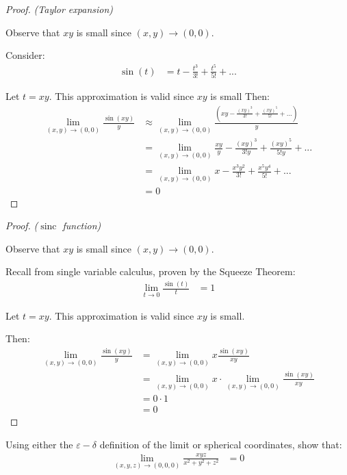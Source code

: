 \begin{proof}
\textit{(Taylor expansion)}

Observe that \(xy\) is small since \((x, y) \rightarrow (0, 0)\). 

Consider:
    \begin{align}
        \sin(t) &= t - \frac{t^3}{3!} + \frac{t^5}{5!} + ...
    \end{align}

\newpage 

Let \(t = xy\). This approximation is valid since \(xy\) is small Then:
    \begin{align*}
        \lim_{(x, y) \rightarrow (0, 0)} \frac{\sin(xy)}{y} &\approx \lim_{(x, y) \rightarrow (0, 0)} \frac{\left(xy - \frac{(xy)^3}{3!} + \frac{(xy)^5}{5!} + ...\right)}{y} \\
        &= \lim_{(x, y) \rightarrow (0, 0)} \frac{xy}{y} - \frac{(xy)^3}{3!y} + \frac{(xy)^5}{5!y} + ... \\
        &= \lim_{(x, y) \rightarrow (0, 0)} x - \frac{x^3y^2}{3!} + \frac{x^5y^4}{5!} + ... \\
        &= 0
    \end{align*}
\end{proof}

\begin{proof}
\textit{(\(\operatorname{sinc}\) function)}

Observe that \(xy\) is small since \((x, y) \rightarrow (0, 0)\). 

Recall from single variable calculus, proven by the Squeeze Theorem:
    \begin{align}
        \lim_{t \rightarrow 0} \frac{\sin(t)}{t} &= 1
    \end{align}

Let \(t = xy\). This approximation is valid since \(xy\) is small.

Then:
    \begin{align*}
        \lim_{(x, y) \rightarrow (0, 0)} \frac{\sin(xy)}{y} &= \lim_{(x, y) \rightarrow (0, 0)} x\frac{\sin(xy)}{xy} \\
        &= \lim_{(x, y) \rightarrow (0, 0)} x \cdot \lim_{(x, y) \rightarrow (0, 0)} \frac{\sin(xy)}{xy} \\
        &= 0 \cdot 1 \\
        &= 0
    \end{align*}
\end{proof}

\begin{tcolorbox}[
        title={Problem 26},
        valign=center,
        nobeforeafter,
        colframe=gray!95!black
    ]
Using either the \(\varepsilon - \delta\) definition of the limit or spherical coordinates, show that: 
    \begin{align}
        \lim_{(x, y, z) \rightarrow (0, 0, 0)} \frac{xyz}{x^2 + y^2 + z^2} &= 0
    \end{align}
\end{tcolorbox}

